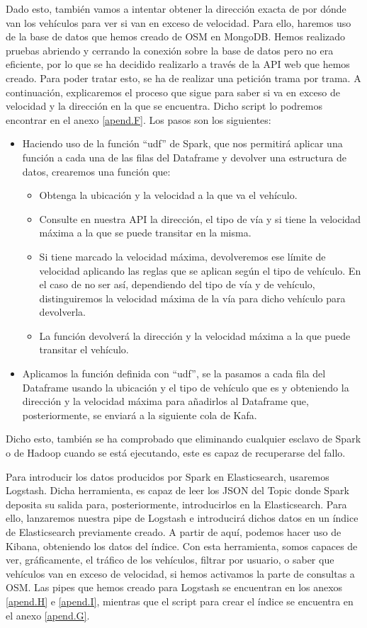 Dado esto, también vamos a intentar obtener la dirección exacta de por dónde van los vehículos para ver si van en exceso de velocidad. Para ello, haremos uso de la base de datos que hemos creado de OSM en MongoDB. Hemos realizado pruebas abriendo y cerrando la conexión sobre la base de datos pero no era eficiente, por lo que se ha decidido realizarlo a través de la API web que hemos creado. Para poder tratar esto, se ha de realizar una petición trama por trama. A continuación, explicaremos el proceso que sigue para saber si va en exceso de velocidad y la dirección en la que se encuentra. Dicho script lo podremos encontrar en el anexo \ref{apend.F}. Los pasos son los siguientes:

\begin{itemize}
        \item Haciendo uso de la función “udf” de Spark, que nos permitirá aplicar una función a cada una de las filas del Dataframe y devolver una estructura de datos, crearemos una función que:
        \begin{itemize}
                \item Obtenga la ubicación y la velocidad a la que va el vehículo.
                \item Consulte en nuestra API la dirección, el tipo de vía y si tiene la velocidad máxima a la que se puede transitar en la misma.
                \item Si tiene marcado la velocidad máxima, devolveremos ese límite de velocidad aplicando las reglas que se aplican según el tipo de vehículo. En el caso de no ser así, dependiendo del tipo de vía y de vehículo, distinguiremos la velocidad máxima de la vía para dicho vehículo para devolverla.
                \item La función devolverá la dirección y la velocidad máxima a la que puede transitar el vehículo.
        \end{itemize}
        \item Aplicamos la función definida con “udf”, se la pasamos a cada fila del Dataframe usando la ubicación y el tipo de vehículo que es y obteniendo la dirección y la velocidad máxima para añadirlos al Dataframe que, posteriormente, se enviará a la siguiente cola de Kafa.
\end{itemize}
Dicho esto, también se ha comprobado que eliminando cualquier esclavo de Spark o de Hadoop cuando se está ejecutando, este es capaz de recuperarse del fallo.

Para introducir los datos producidos por Spark en Elasticsearch, usaremos Logstash. Dicha herramienta, es capaz de leer los JSON del Topic donde Spark deposita su salida para, posteriormente, introducirlos en la Elasticsearch. Para ello, lanzaremos nuestra pipe de Logstash e introducirá dichos datos en un índice de Elasticsearch previamente creado. A partir de aquí, podemos hacer uso de Kibana, obteniendo los datos del índice. Con esta herramienta, somos capaces de ver, gráficamente, el tráfico de los vehículos, filtrar por usuario, o saber que vehículos van en exceso de velocidad, si hemos activamos la parte de consultas a OSM. Las pipes que hemos creado para Logstash se encuentran en los anexos \ref{apend.H} e \ref{apend.I}, mientras que el script para crear el índice se encuentra en el anexo \ref{apend.G}.

